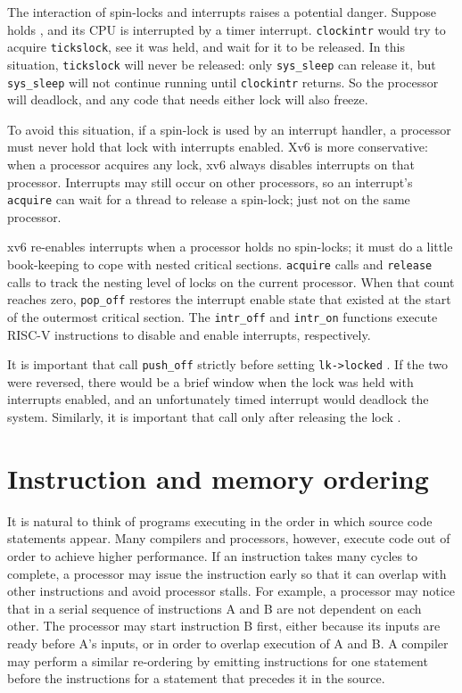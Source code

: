 The interaction of spin-locks and interrupts raises a potential danger.
Suppose
holds
,
and its CPU is interrupted by a timer interrupt.
\lstinline{clockintr}
would try to acquire
\lstinline{tickslock},
see it was held, and wait for it to be released.
In this situation,
\lstinline{tickslock}
will never be released: only
\lstinline{sys_sleep}
can release it, but
\lstinline{sys_sleep}
will not continue running until
\lstinline{clockintr}
returns.
So the processor will deadlock, and any code
that needs either lock will also freeze.

To avoid this situation, if a spin-lock is used by an interrupt handler,
a processor must never hold that lock with interrupts enabled.
Xv6 is more conservative: when a processor acquires any
lock, xv6 always disables interrupts on that processor.
Interrupts may still occur on other processors, so 
an interrupt's
\lstinline{acquire}
can wait for a thread to release a spin-lock; just not on the same processor.

xv6 re-enables interrupts when a processor holds no spin-locks; it must
do a little book-keeping to cope with nested critical sections.
\lstinline{acquire}
calls
and
\lstinline{release}
calls
to track the nesting level of locks on the current processor.
When that count reaches zero,
\lstinline{pop_off} 
restores the interrupt enable state that existed 
at the start of the outermost critical section.
The
\lstinline{intr_off}
and
\lstinline{intr_on}
functions execute RISC-V instructions to disable and enable
interrupts, respectively.

It is important that
call
\lstinline{push_off}
strictly before setting
\lstinline{lk->locked}
.
If the two were reversed, there would be
a brief window when the lock
was held with interrupts enabled, and
an unfortunately timed interrupt would deadlock the system.
Similarly, it is important that
call
only after 
releasing the lock
.
\section{Instruction and memory ordering}

It is natural to think of programs executing in the order
in which source code statements appear.
Many
compilers and processors, however, execute code out of order
to achieve
higher performance.  If an instruction takes many cycles to complete,
a processor may issue the instruction early so that it can
overlap with other instructions and avoid processor stalls. For
example, a processor may notice that in a serial sequence of
instructions A and B are not dependent on each other.
The processor may start instruction B first, either because its
inputs are ready before A's inputs, or in order to overlap
execution of A and B.
A compiler may perform a similar re-ordering by emitting instructions
for one statement before the instructions for a statement that precedes it
in the source.

